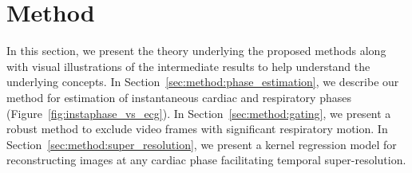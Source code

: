 \documentclass[journal]{IEEEtran}
\begin{document}
\section{Method}
\label{sec:method}
%
In this section, we present the theory underlying the proposed methods along with visual illustrations of the intermediate results to help understand the underlying concepts. In Section~\ref{sec:method:phase_estimation}, we describe our method for estimation of instantaneous cardiac and respiratory phases  (Figure~\ref{fig:instaphase_vs_ecg}). In Section~\ref{sec:method:gating}, we present a robust method to exclude video frames with significant respiratory motion. In Section~\ref{sec:method:super_resolution}, we present a kernel regression model for reconstructing images at any cardiac phase facilitating temporal super-resolution.
%
\end{document}
